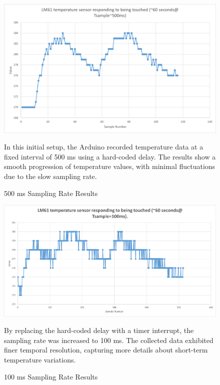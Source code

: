 \documentclass[journal]{IEEEtran}
\begin{document}
\begin{figure}[H]
    \centering
    \includegraphics[width=\linewidth]{1.1.png}
    \caption{500 ms Sampling Rate Results}
    \begin{minipage}{\linewidth}
      In this initial setup, the Arduino recorded temperature data at a fixed interval of 500 ms using a hard-coded delay. The results show a smooth progression of temperature values, with minimal fluctuations due to the slow sampling rate.
  \end{minipage}
    \label{fig:part1_500ms}
\end{figure}

\begin{figure}[H]
    \centering
    \includegraphics[width=\linewidth]{2.1.png}
    \caption{100 ms Sampling Rate Results}
    \vspace{1em} %
    \begin{minipage}{\linewidth}
      By replacing the hard-coded delay with a timer interrupt, the sampling rate was increased to 100 ms. The collected data exhibited finer temporal resolution, capturing more details about short-term temperature variations.
    \end{minipage}
    \label{fig:part2_100ms}
\end{figure}
\end{document}
